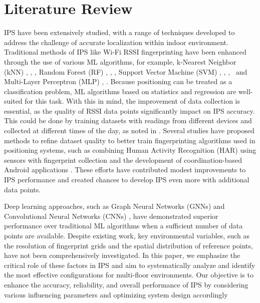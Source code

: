 \documentclass[runningheads]{llncs}
\begin{document}
\section{Literature Review}
\vspace{-10pt}
IPS have been extensively studied, with a range of techniques developed to address the challenge of accurate localization within indoor environment. Traditional methods of IPS like Wi-Fi RSSI fingerprinting have been enhanced through the use of various ML algorithms, for example, k-Nearest Neighbor (kNN) \cite{LRE1}, \cite{LRE2}, \cite{LRE6}, Random Forest (RF) \cite{LRE1}, \cite{LRE6}, \cite{LRE5}, Support Vector Machine (SVM) \cite{LRE1}, \cite{LRE2}, \cite{LRE6},~\cite{add1} and Multi-Layer Perceptron (MLP) \cite{LRE1}, \cite{LRE2}. Because positioning can be treated as a classification problem,  ML algorithms based on statistics and regression are well-suited for this task. With this in mind, the improvement of data collection is essential, as the quality of RSSI data points significantly impact on IPS accuracy. This could be done by training datasets with readings from different devices and collected at different times of the day, as noted in \cite{LRE3}. Several studies have proposed methods to refine dataset quality to better train fingerprinting algorithms used in positioning systems, such as combining Human Activity Recognition (HAR) using sensors with fingerprint collection \cite{LRE4} and the development of coordination-based Android applications \cite{LRE7}. These efforts have contributed modest improvements to IPS performance and created chances to develop IPS even more with additional data points. 

Deep learning approaches, such as Graph Neural Networks (GNNs) \cite{LRE2} and Convolutional Neural Networks (CNNs) \cite{LRE4}, have demonstrated superior performance over traditional ML algorithms when a sufficient number of data points are available. Despite existing work, key environmental variables, such as the resolution of fingerprint grids and the spatial distribution of reference points, have not been comprehensively investigated. In this paper, we emphasize the critical role of these factors in IPS and aim to systematically analyze and identify the most effective configurations for multi-floor environments. Our objective is to enhance the accuracy, reliability, and overall performance of IPS by considering various influencing parameters and optimizing system design accordingly

\end{document}
